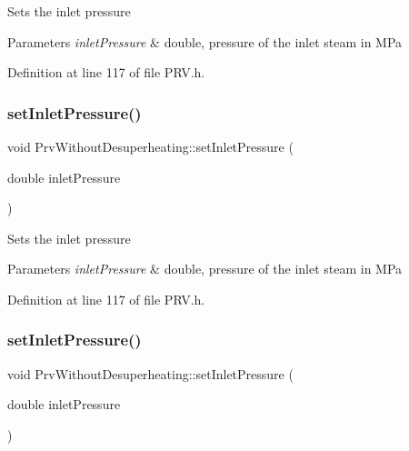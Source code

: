 Sets the inlet pressure


\begin{DoxyParams}{Parameters}
{\em inlet\+Pressure} & double, pressure of the inlet steam in M\+Pa \\
\hline
\end{DoxyParams}


Definition at line 117 of file P\+R\+V.\+h.

\mbox{\label{class_prv_without_desuperheating_a26039a0a228ca66f96e8402bf741b9d9}} 
\subsubsection{\texorpdfstring{set\+Inlet\+Pressure()}{setInletPressure()}\hspace{0.1cm}{\footnotesize\ttfamily [2/3]}}
{\footnotesize\ttfamily void Prv\+Without\+Desuperheating\+::set\+Inlet\+Pressure (\begin{DoxyParamCaption}\item[{double}]{inlet\+Pressure }\end{DoxyParamCaption})\hspace{0.3cm}{\ttfamily [inline]}}

Sets the inlet pressure


\begin{DoxyParams}{Parameters}
{\em inlet\+Pressure} & double, pressure of the inlet steam in M\+Pa \\
\hline
\end{DoxyParams}


Definition at line 117 of file P\+R\+V.\+h.

\mbox{\label{class_prv_without_desuperheating_a26039a0a228ca66f96e8402bf741b9d9}} 
\subsubsection{\texorpdfstring{set\+Inlet\+Pressure()}{setInletPressure()}\hspace{0.1cm}{\footnotesize\ttfamily [3/3]}}
{\footnotesize\ttfamily void Prv\+Without\+Desuperheating\+::set\+Inlet\+Pressure (\begin{DoxyParamCaption}\item[{double}]{inlet\+Pressure }\end{DoxyParamCaption})\hspace{0.3cm}{\ttfamily [inline]}}

